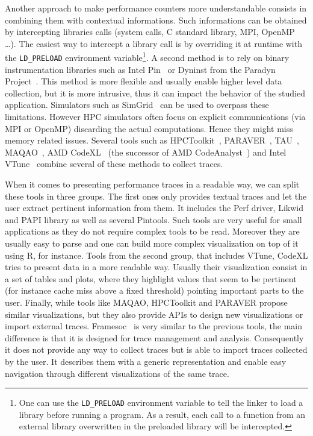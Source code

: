 Another approach to make performance counters more understandable consists in combining them with contextual informations.
Such informations can be obtained by intercepting libraries calls (system calls, C standard library, \gls{MPI}, \gls{OpenMP} \ldots).
The easiest way to intercept a library call is by overriding it at runtime with the \texttt{LD\_PRELOAD} environment variable\footnote{
    One can use the \texttt{LD\_PRELOAD} environment variable to tell the linker to load a library before running a program.
    As a result, each call to a function from an external library overwritten in the preloaded library will be intercepted.}.
A second method is to rely on binary instrumentation libraries such as \gls{Intel} \gls{Pin}~\cite{Luk05Pin} or Dyninst from the Paradyn Project~\cite{Miller95Paradyn}.
This method is more flexible and usually enable higher level data collection, but it is more intrusive, thus it can impact the behavior of the studied application.
Simulators such as \gls{SimGrid}~\cite{Casanova14Versatile} can be used to overpass these limitations.
However \gls{HPC} simulators often focus on explicit communications (via \gls{MPI} or \gls{OpenMP}) discarding the actual computations.
Hence they might miss memory related issues.
Several tools such as \gls{HPCToolkit}~\cite{Adhianto10HPCTOOLKIT}, \gls{PARAVER}~\cite{Pillet95PARAVER}, \gls{TAU}~\cite{Shende06Tau}, \gls{MAQAO}~\cite{Djoudi05MAQAO}, \gls{AMD} \gls{CodeXL}~\cite{AMD16CodeXL} (the successor of \gls{AMD} \gls{CodeAnalyst}~\cite{Drongowski08introduction}) and \gls{Intel} \gls{VTune}~\cite{Reinders05VTune} combine several of these methods to collect traces.

When it comes to presenting performance traces in a readable way, we can split these tools in three groups.
The first ones only provides textual traces and let the user extract pertinent information from them.
It includes the \gls{Perf} driver, \gls{Likwid} and \gls{PAPI} library as well as several \glspl{Pintool}.
Such tools are very useful for small applications as they do not require complex tools to be read.
Moreover they are usually easy to parse and one can build more complex visualization on top of it using \gls{R}, for instance.
Tools from the second group, that includes \gls{VTune}, \gls{CodeXL} tries to present data in a more readable way.
Usually their visualization consist in a set of tables and plots, where they highlight values that seem to be pertinent (for instance cache miss above a fixed threshold) pointing important parts to the user.
Finally, while tools like \gls{MAQAO}, \gls{HPCToolkit} and \gls{PARAVER} propose similar visualizations, but they also provide \glspl{API} to design new visualizations or import external traces.
\gls{Framesoc}~\cite{Pagano13Trace,Pagano14frameSoC} is very similar to the previous tools, the main difference is that it is designed for trace management and analysis.
Consequently it does not provide any way to collect traces but is able to import traces collected by the user.
It describes them with a generic representation and enable easy navigation through different visualizations of the same trace.

